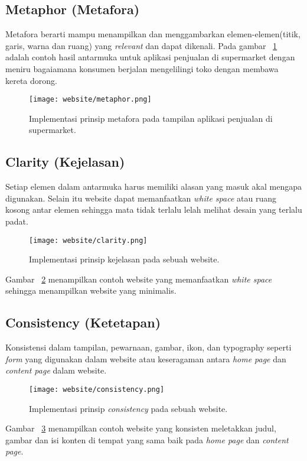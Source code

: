 \subsection{Metaphor (Metafora)}
Metafora berarti mampu menampilkan dan menggambarkan elemen-elemen(titik, garis, warna dan ruang) yang \textit{relevant} dan dapat dikenali. Pada gambar ~\ref{fig:metaphor} adalah contoh hasil antarmuka untuk aplikasi penjualan di supermarket dengan meniru bagaiamana konsumen berjalan mengelilingi toko dengan membawa kereta dorong. 
\begin{figure} [H]
	\centering  
	\texttt{[image: website/metaphor.png]}  
	\caption{Implementasi prinsip metafora pada tampilan aplikasi penjualan di supermarket.}
	\label{fig:metaphor}	 
\end{figure}

\subsection{Clarity (Kejelasan)}
Setiap elemen dalam antarmuka harus memiliki alasan yang masuk akal mengapa digunakan. Selain itu website dapat memanfaatkan \textit{white space} atau ruang kosong antar elemen sehingga mata tidak terlalu lelah melihat desain yang terlalu padat. 
\begin{figure} [H]
	\centering  
	\texttt{[image: website/clarity.png]}  
	\caption{Implementasi prinsip kejelasan pada sebuah website.}
	\label{fig:clarity}	 
\end{figure}
\noindent Gambar ~\ref{fig:clarity} menampilkan contoh website yang memanfaatkan \textit{white space} sehingga menampilkan website yang minimalis.

\subsection{Consistency (Ketetapan)}
Konsistensi dalam tampilan, pewarnaan, gambar, ikon, dan typography seperti \textit{form} yang digunakan dalam website atau keseragaman antara \textit{home page} dan \textit{content page} dalam website.
\begin{figure} [H]
	\centering  
	\texttt{[image: website/consistency.png]}  
	\caption{Implementasi prinsip \textit{consistency} pada sebuah website.}
	\label{fig:consistency}	 
\end{figure}
\noindent Gambar ~\ref{fig:consistency} menampilkan contoh website yang konsisten meletakkan judul, gambar dan isi konten di tempat yang sama baik pada \textit{home page} dan \textit{content page}.

